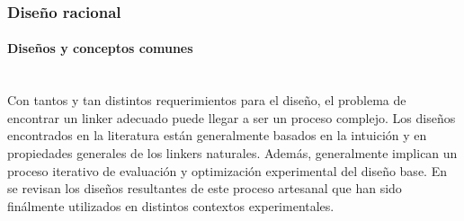 % 
% 











































%             
\subsubsection{Diseño racional}

\paragraph{Diseños y conceptos comunes} \hspace{0pt} \\ \indent 
% 
% 
Con tantos y tan distintos requerimientos para el diseño, el problema de encontrar un linker adecuado puede llegar a ser un proceso complejo.
Los diseños encontrados en la literatura están generalmente basados en la intuición y en propiedades generales de los linkers naturales. 
Además, generalmente implican un proceso iterativo de evaluación y optimización experimental del diseño base.
En \cite{chen2013fusion} se revisan los diseños resultantes de este proceso artesanal que han sido finálmente utilizados en distintos contextos experimentales.


